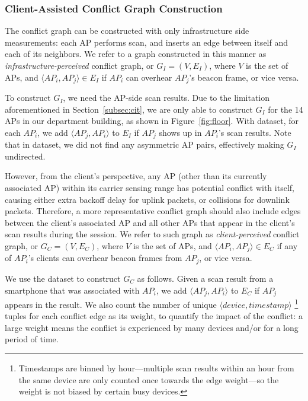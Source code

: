 \subsubsection{Client-Assisted Conflict Graph Construction}
\label{subsec:client_conflict}

The conflict graph can be constructed with only infrastructure side measurements:
each AP performs \wifi{} scan, and inserts an edge between itself and
each of its neighbors. We refer to a graph constructed in this manner as
\textit{infrastructure-perceived} conflict graph, or $G_I=(V, E_I)$, where $V$
is the set of APs, and $\langle AP_i, AP_j \rangle \in E_I$ if $AP_i$ can
overhear $AP_j$'s beacon frame, or vice versa. 

To construct $G_I$, we need the AP-side scan results. Due to the limitation
aforementioned in Section~\ref{subsec:cit}, we are only able to construct $G_I$
for the 14 APs in our department building, as shown in Figure~\ref{fig:floor}.
With \ubapdetail{} dataset, for each $AP_i$, we add $\langle AP_j, AP_i \rangle$
to $E_I$ if $AP_j$ shows up in $AP_i$'s scan results. Note that in \ubapdetail{}
dataset, we did not find any asymmetric AP pairs, effectively making $G_I$ undirected.

However, from the \wifi{} client's perspective, any AP (other than its currently
associated AP) within its carrier sensing range has potential conflict with
itself, causing either extra backoff delay for uplink packets, or collisions for
downlink packets. Therefore, a more representative conflict graph should also
include edges between the client's associated AP and all other APs that appear
in the client's scan results during the \wifi{} session. We refer to such graph as
\textit{client-perceived} conflict graph, or $G_C=(V, E_C)$, where $V$ is the
set of APs, and $\langle AP_i, AP_j \rangle \in E_C$ if any of $AP_i$'s clients
can overhear beacon frames from $AP_j$, or vice versa.

We use the \ubscan{} dataset to construct $G_C$ as follows. Given a scan
result from a smartphone that was associated with $AP_i$, we add $\langle AP_j,
AP_i \rangle$ to $E_C$ if $AP_j$ appears in the result. We also count the number
of unique $\langle device, timestamp \rangle$%
\footnote{Timestamps are binned by hour---multiple scan results within an hour
from the same device are only counted once towards the edge weight---so the
weight is not  biased by certain busy devices.} %
tuples for each conflict edge as its weight, to quantify the impact of
the conflict: a large weight means the conflict is experienced by many
devices and/or for a long period of time.


